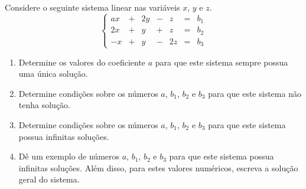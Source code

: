 \begin{problem}
Considere o seguinte sistema linear nas variáveis  $x$, $y$ e $z$.
$$\left\{ \begin{array}{rrrrrrr}
ax & + & 2y & - &  z & = & b_1 \\
2x & + &  y & + &  z & = & b_2 \\
-x & + &  y & - &  2z & = & b_3 \end{array} \right.$$
\begin{enumerate}
\item[(a)] Determine os valores do coeficiente $a$ para que este sistema sempre possua uma única solução.
\item[(b)] Determine condições sobre os números $a$, $b_1$, $b_2$ e $b_3$ para que este sistema não tenha solução.
\item[(c)] Determine condições sobre os números $a$, $b_1$, $b_2$ e $b_3$ para que este sistema possua infinitas soluções.
\item[(d)] Dê um exemplo de números $a$, $b_1$, $b_2$ e $b_3$ para que este sistema possua infinitas soluções. Além  disso, para estes valores numéricos, escreva a solução geral do sistema.
\end{enumerate}
\end{problem}
